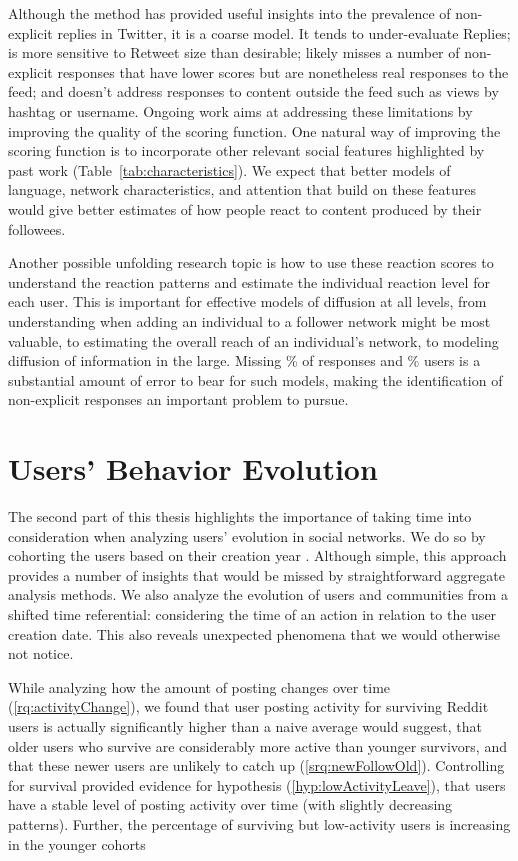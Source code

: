 Although the method has provided useful insights into the prevalence of non-explicit replies in Twitter, it is a coarse model.  It tends to under-evaluate Replies; is more sensitive to Retweet size than desirable; likely misses a number of non-explicit responses that have lower scores but are nonetheless real responses to the feed; and doesn't address responses to content outside the feed such as views by hashtag or username.  Ongoing work aims at addressing these limitations by improving the quality of the scoring function.  One natural way of improving the scoring function is to incorporate other relevant social features highlighted by past work (Table~\ref{tab:characteristics}).  We expect that better models of language, network characteristics, and attention that build on these features would give better estimates of how people react to content produced by their followees.

Another possible unfolding research topic is how to use these reaction scores to understand the reaction patterns and estimate the individual reaction level for each user.  This is important for effective models of diffusion at all levels, from understanding when adding an individual to a follower network might be most valuable, to estimating the overall reach of an individual's network, to modeling diffusion of information in the large.  Missing \highNonTaggedTweetCountPct{}\% of responses and \usersAboveLinePct{}\% users is a substantial amount of error to bear for such models, making the identification of non-explicit responses an important problem to pursue.


\section{Users' Behavior Evolution}

The second part of this thesis highlights the importance of taking time into consideration when analyzing users' evolution in social networks. We do so by cohorting the users based on their creation year \cite{Barbosa2016}. Although simple, this approach provides a number of insights that would be missed by straightforward aggregate analysis methods.  We also analyze the evolution of users and communities from a shifted time referential: considering the time of an action in relation to the user creation date. This also reveals unexpected phenomena that we would otherwise not notice.

While analyzing how the amount of posting changes over time (\ref{rq:activityChange}), we found that user posting activity for surviving Reddit users is actually significantly higher than a naive average would suggest, that older users who survive are considerably more active than younger survivors, and that these newer users are unlikely to catch up (\ref{srq:newFollowOld}).  Controlling for survival provided evidence for hypothesis (\ref{hyp:lowActivityLeave}), that users have a stable level of posting activity over time (with slightly decreasing patterns).  Further, the percentage of surviving but low-activity users is increasing in the younger cohorts 


